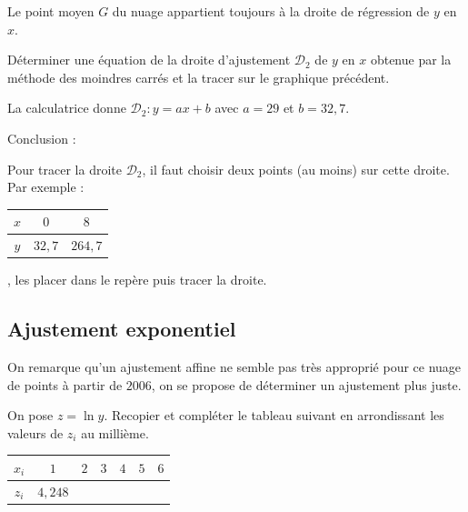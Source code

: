 \documentclass[french]{book}
\begin{document}
\begin{prop}
   Le point moyen $G$ du nuage appartient toujours à la droite de régression de $y$ en $x$.
\end{prop}



\begin{exemple}
   Déterminer une équation de la droite d'ajustement $\mathcal{D}_2$ de $y$ en $x$ obtenue par la méthode des moindres carrés et la tracer sur le graphique précédent.
\end{exemple}

La calculatrice donne $\mathcal{D}_2:y=ax+b$ avec $a=29$ et $b=32,7$.

Conclusion : 

Pour tracer la droite $\mathcal{D}_2$, il faut choisir deux points (au moins) sur cette droite.\\
Par exemple : \quad 
\begin{tabular}{C{1}|C{1}|C{1}}
   $x$ & $0$ & $8$ \\
   \hline
   $y$ & $32,7$ & $264,7$ \\
\end{tabular}
\quad , les placer dans le repère puis tracer la droite.

\subsection{Ajustement exponentiel}%

On remarque qu'un ajustement affine ne semble pas très approprié pour ce nuage de points à partir de $2006$, on se propose de déterminer un ajustement plus juste.



\begin{exemple}
   On pose $z=\ln y$. Recopier et compléter le tableau suivant en arrondissant les valeurs de $z_{i}$ au millième. 
   \begin{center}
      \begin{tabular}{|*{7}{C{1}|}}
         \hline
         $x_{i}$ & $1$ & $2$ & $3$ & $4$ & $5$ & $6$ \\
         \hline
         $z_{i}$ & $4,248$ & & & & & \\
         \hline
      \end{tabular}
   \end{center}
\end{exemple}
\end{document}
